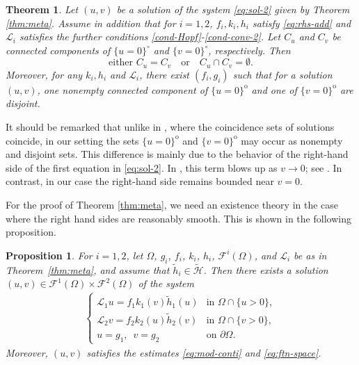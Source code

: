 \documentclass[11pt,oneside,english]{amsart}
\newcommand{\cL}{{\mathcal L}}
\newcommand{\cF}{{\mathcal F}}
\numberwithin{equation}{section}
\newtheorem{theorem}{Theorem}
\theoremstyle{plain}
\newtheorem{proposition}{Proposition}
\numberwithin{equation}{section}
\begin{document}
\begin{theorem}\label{thm:support}Let $(u,v)$ be a solution of the system \eqref{eq:sol-2} given by Theorem \ref{thm:meta}.
Assume in addition that for  $i=1,2$, $f_i, k_i,h_i$ satisfy \eqref{eq:rhs-add} and $\cL_i$ satisfies the further conditions \ref{cond-Hopf}-\ref{cond-conv-2}. 
Let $C_u$ and $C_v$ be connected components of $\{u=0\}^\circ$ and $\{v=0\}^\circ$, respectively. Then
\[
\text{either } C_u = C_v \quad \text{or} \quad C_u \cap C_v = \emptyset.
\]
Moreover, for any $k_i,h_i$ and $\cL_i$, there exist $(f_i,g_i)$ such that for a solution $(u,v)$, one nonempty connected component of $\{u=0\}^{\mathrm{o}}$ and one of 
$\{v=0\}^{\mathrm{o}}$ are disjoint.
\end{theorem}



It should be remarked that unlike in \cite{ELSH25}, where the coincidence sets of solutions coincide, in our setting the sets $\{u=0\}^{\mathrm{o}}$ and $\{v=0\}^{\mathrm{o}}$ may  occur as nonempty and disjoint sets. This difference is mainly due to the behavior of the right-hand side of the first equation in \eqref{eq:sol-2}. In \cite{ELSH25}, this term blows up as $v\to0$; see \cite[Assumption 1 (A2)]{ELSH25}. In contrast, in our case the right-hand side remains bounded near $v=0$.





For the proof of Theorem \ref{thm:meta}, we need an existence theory in the case where the right hand sides are reasonably smooth.
This is shown in the following proposition.

\begin{proposition}\label{prop:meta}
    For $i=1,2$, let $\Omega$,  $g_i$, $f_i$, $k_i$, $h_i$,  $\mathcal{F}^i(\Omega)$, and
$\mathcal{L}_i$ be as in Theorem~\ref{thm:meta}, and assume that 
$\tilde h_i\in \widetilde{\mathcal{H}}$.
    Then there exists a solution $(u,v)\in\cF^1(\Omega)\times\cF^2(\Omega)$ of the system
    \begin{align*}
        \begin{cases}
            \cL_1u=f_1k_1(v)\tilde h_1(u)&\text{in }\Omega\cap\{u>0\},\\
            \cL_2v=f_2k_2(u)\tilde h_2(v)&\text{in }\Omega\cap\{v>0\},\\
            u=g_1,\,\,\, v=g_2&\text{on }\partial\Omega.
        \end{cases}
    \end{align*}
    Moreover,  $(u,v)$ satisfies the estimates \eqref{eq:mod-conti} and \eqref{eq:ftn-space}.
\end{proposition}
\end{document}
